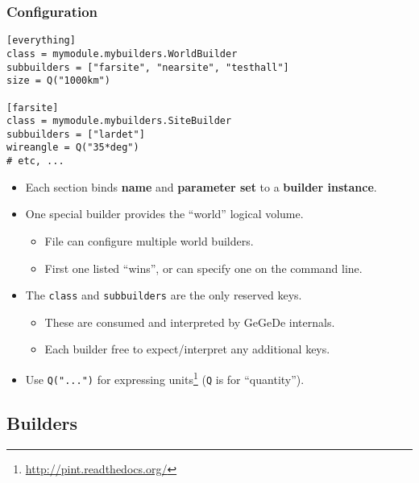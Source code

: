 \documentclass[10pt,xcolor=dvipsnames]{beamer}
\begin{document}
\begin{frame}[fragile]
  \frametitle{Configuration}
\small
\begin{verbatim}
[everything]  
class = mymodule.mybuilders.WorldBuilder
subbuilders = ["farsite", "nearsite", "testhall"]
size = Q("1000km")

[farsite]
class = mymodule.mybuilders.SiteBuilder
subbuilders = ["lardet"]
wireangle = Q("35*deg")
# etc, ...
\end{verbatim}

  \begin{itemize}
  \item Each section binds \textbf{name} and \textbf{parameter set} to a \textbf{builder instance}.
  \item One special builder provides the ``world'' logical volume.
    \begin{itemize}\footnotesize
    \item File can configure multiple world builders.
    \item First one listed ``wins'', or can specify one on the command line.
    \end{itemize}
  \item The \texttt{class} and \texttt{subbuilders} are the only reserved keys.
    \begin{itemize}\footnotesize
    \item These are consumed and interpreted by GeGeDe internals.
    \item Each builder free to expect/interpret any additional keys.
    \end{itemize}
  \item Use \texttt{Q("...")} for expressing units\footnote{\url{http://pint.readthedocs.org/}} (\texttt{Q} is for ``quantity'').
  \end{itemize}

\end{frame}

\subsection{Builders}
\end{document}
